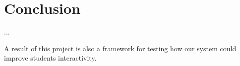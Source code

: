 \section{Conclusion}

...

A result of this project is also a framework for testing how our system could improve students interactivity.